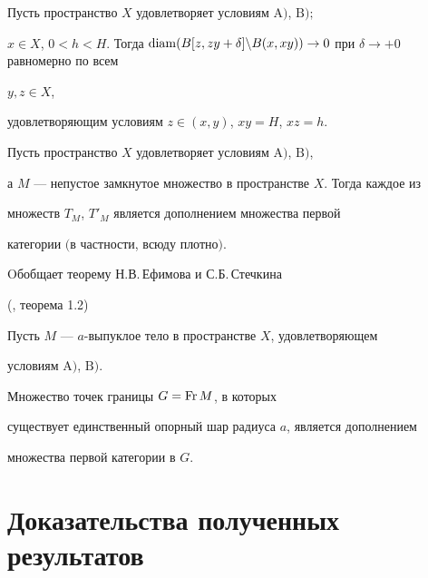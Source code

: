 \begin{lem}


Пусть пространство $X$ удовлетворяет условиям $\mathrm A)$, $\mathrm B);$


$x\in X$, $0<h<H$. Тогда $\diam(B[z,zy


+\delta]\backslash B(x,xy))\to 0$ при $\delta\to+0$ равномерно по всем


$y,z\in X$,


удовлетворяющим условиям $z\in(x,y)$, $xy=H$, $xz=h$.


\end{lem}





\begin{thm}


Пусть пространство $X$ удовлетворяет условиям $\mathrm A)$, $\mathrm B)$,


а $M$ --- непустое замкнутое множество в пространстве $X$. Тогда каждое из


множеств $T_{M}$, $T'_{M}$ является дополнением множества первой


категории $($в частности, всюду плотно$)$.


\end{thm}





Oбобщает теорему Н.В.\,Ефимова и С.Б.\,Стечкина


(\cite{Vla}, теорема 1.2)





\begin{thm}


Пусть $M$ --- $a$-выпуклое тело в пространстве $X$, удовлетворяющем


условиям $\mathrm A)$, $\mathrm B)$.


Множество точек границы $G = \operatorname{Fr} M$, в которых


существует единственный опорный шар радиуса $a$, является дополнением


множества первой категории в $G$.


\end{thm}





\section{Доказательства полученных результатов}





